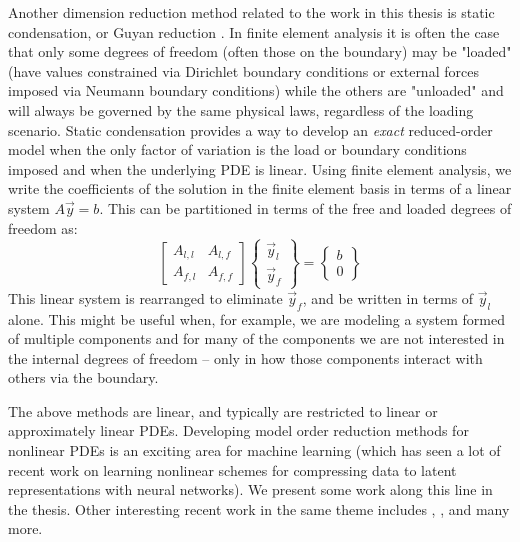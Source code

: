\documentclass{puthesis}
\begin{document}
Another dimension reduction method related to the work in this thesis is static
condensation, or Guyan reduction \citep{guyan1965reduction}.
In finite element analysis it is often the case that only some degrees of freedom
(often those on the boundary) may be "loaded" (have values constrained via
Dirichlet boundary conditions or external forces imposed via Neumann boundary conditions)
while the others are "unloaded" and will always be governed by the same physical laws,
regardless of the loading scenario.
Static condensation provides a way to develop an \emph{exact}
reduced-order model when the only factor of variation is the load or boundary
conditions imposed and when the underlying PDE is linear.
Using finite element analysis, we write the coefficients of the solution in the finite
element basis in terms of a linear system $A\vec{y} = b$.
This can be partitioned in terms of the free and loaded degrees of freedom as:
\[
\begin{bmatrix}
A_{l,l} & A_{l,f} \\
A_{f,l} & A_{f,f}
\end{bmatrix}
\begin{Bmatrix}
  \vec{y}_l \\
  \vec{y}_f
\end{Bmatrix} =
\begin{Bmatrix}
  b \\
  0
\end{Bmatrix}
\]
This linear system is rearranged to eliminate $\vec{y}_f$, and be written in terms of
$\vec{y}_l$ alone.
This might be useful when, for example, we are modeling a system formed of multiple
components and for many of the components we are not interested in the internal degrees
of freedom -- only in how those components interact with others via the boundary.

The above methods are linear, and typically are restricted to linear or
approximately linear PDEs.
Developing model order reduction methods for nonlinear PDEs is an exciting area for
machine learning (which has seen a lot of recent work on learning nonlinear schemes
for compressing data to latent representations with neural networks).
We present some work along this line in the thesis.
Other interesting recent work in the same theme includes
\citet{bar2019learning}, \citet{maulik2021reduced}, and many more.
\end{document}
